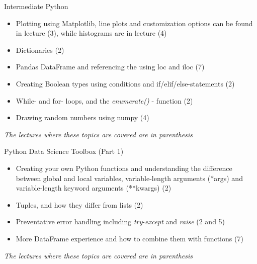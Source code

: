 \documentclass[10pt,danish,t,10pt]{beamer}
\newcommand{\code}[1]{\textit{#1}} %
\begin{document}
\begin{frame}{Intermediate Python}
    \begin{itemize}
        \item Plotting using Matplotlib, line plots and customization options can be found in lecture (3), while histograms are in lecture (4)
        \item Dictionaries (2)
        \item Pandas DataFrame and referencing the using loc and iloc (7)
        \item Creating Boolean types using conditions and if/elif/else-statements (2)
        \item While- and for- loops, and the \code{enumerate()} - function (2)
        \item Drawing random numbers using numpy (4)
    \end{itemize} 
    \mbox{}
    \vfill
    \textit{The lectures where these topics are covered are in parenthesis} 
\end{frame}

\begin{frame}{Python Data Science Toolbox (Part 1)}
    \begin{itemize}
        \item Creating your own Python functions and understanding the difference between global and local variables, variable-length arguments (*args) and variable-length keyword arguments (**kwargs) (2)
        \item Tuples, and how they differ from lists (2)
        \item Preventative error handling including \code{try}-\code{except} and \code{raise} (2 and 5)
        \item More DataFrame experience and how to combine them with functions (7)
    \end{itemize}
    \mbox{}
    \vfill
    \textit{The lectures where these topics are covered are in parenthesis} 
\end{frame}
\end{document}
